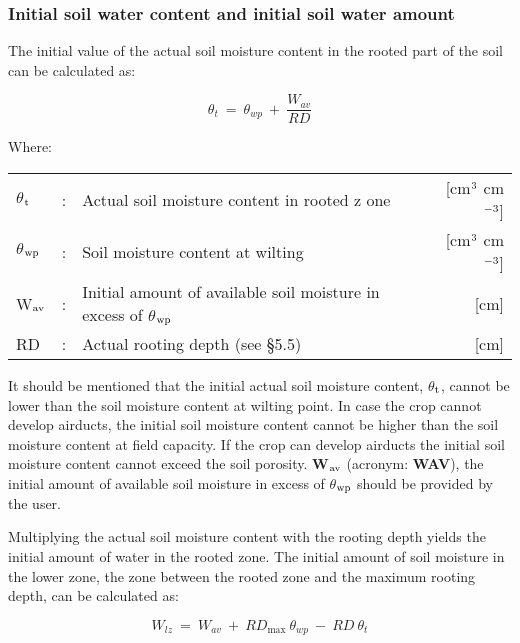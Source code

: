 \subsubsection{Initial soil water content and initial soil water amount}

The initial value of the actual soil moisture content in the rooted part of the soil can be
calculated as:

\begin{equation}
\label{eq:6.18}
\theta_{t} ~ =~\theta_{wp} ~+~{\frac{W_{av}}{RD}}
\end{equation}

Where:\\[5pt]
\begin{tabularx}{\textwidth}{llXr}
	$\theta$$_{{\rm t}}$ &:& Actual soil moisture content in rooted z
	one  & [cm$^{{\rm 3}}$ cm$^{{\rm -3}}$]\\
	$\theta$$_{{\rm wp}}$ &:& Soil moisture content at wilting   & [cm$^{{\rm 3}}$ cm$^{{\rm -3}}$]\\
	W$_{{\rm av}}$ &:& Initial amount of available soil moisture 
	in excess of $\theta$$_{{\rm wp}}$ & [cm]\\
	RD &:& Actual rooting depth (see \S 5.5) & [cm]\\
\end{tabularx}

It should be mentioned that the initial actual soil moisture content, $\theta$$_{{\rm t}}$, cannot be lower
than the soil moisture content at wilting point. In case the crop cannot develop airducts,
the initial soil moisture content cannot be higher than the soil moisture content at field
capacity. If the crop can develop airducts the initial soil moisture content cannot exceed
the soil porosity. {\bf W$_{{\rm av}}$} (acronym: {\bf WAV}), the initial amount of available 
soil moisture in excess of $\theta$$_{{\rm wp}}$ should be provided by the user. 

Multiplying the actual soil moisture content with the rooting depth yields the initial
amount of water in the rooted zone. The initial amount of soil moisture in the lower zone,
the zone between the rooted zone and the maximum rooting depth, can be calculated as:

\begin{equation}
\label{eq:6.19}
W_{lz} ~ =~ W _{av} ~+~ RD_{\max } ~\theta_{wp} ~-~RD~\theta_{t} 
\end{equation}

